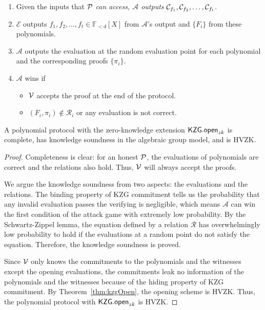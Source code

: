 \begin{definition}
\begin{itemize}
    \begin{enumerate}
        \item Given the inputs that $\mathcal{P}$ \textit{can access, $\mathcal{A}$ outputs} $\mathcal{C}_{f_1},\mathcal{C}_{f_2},\dots,\mathcal{C}_{f_t}$.
        \item $\mathcal{E}$ outputs $f_1,f_2,\dots,f_t\in\mathbb{F}_{<d}[X]$ from $\mathcal{A}$'s output and $\{F_i\}$ from these polynomials.
        \item $\mathcal{A}$ outputs the evaluation at the random evaluation point for each polynomial and the corresponding proofs $\{\pi_i\}$.
        \item $\mathcal{A}$ wins if
        \begin{itemize}
            \item $\mathcal{V}$ accepts the proof at the end of the protocol.
            \item $(F_i,\pi_i)\notin\mathcal{R}_i$ or any evaluation is not correct.
        \end{itemize}
    \end{enumerate}
\end{itemize}
\end{definition}


\begin{theorem}
\label{thm:polyproto}
A polynomial protocol with the zero-knowledge extension $\mathsf{KZG.open}_{zk}$ is complete, has knowledge soundness in the algebraic group model, and is HVZK.
\end{theorem}

\begin{proof}
Completeness is clear: for an honest $\mathcal{P}$, the evaluations of polynomials are correct and the relations also hold. Thus, $\mathcal{V}$ will always accept the proofs.

We argue the knowledge soundness from two aspects: the evaluations and the relations. The binding property of KZG commitment tells us the probability that any invalid evaluation passes the verifying is negligible, which means $\mathcal{A}$ can win the first condition of the attack game with extremely low probability. By the Schwartz-Zippel lemma, the equation defined by a relation $\mathcal{R}$ has overwhelmingly low probability to hold if the evaluations at a random point do not satisfy the equation. Therefore, the knowledge soundness is proved.

Since $\mathcal{V}$ only knows the commitments to the polynomials and the witnesses except the opening evaluations, the commitments leak no information of the polynomials and the witnesses because of the hiding property of KZG commitment. By Theorem~\ref{thm:kzgOpen}, the opening scheme is HVZK. Thus, the polynomial protocol with $\mathsf{KZG.open}_{zk}$ is HVZK.
\end{proof}

